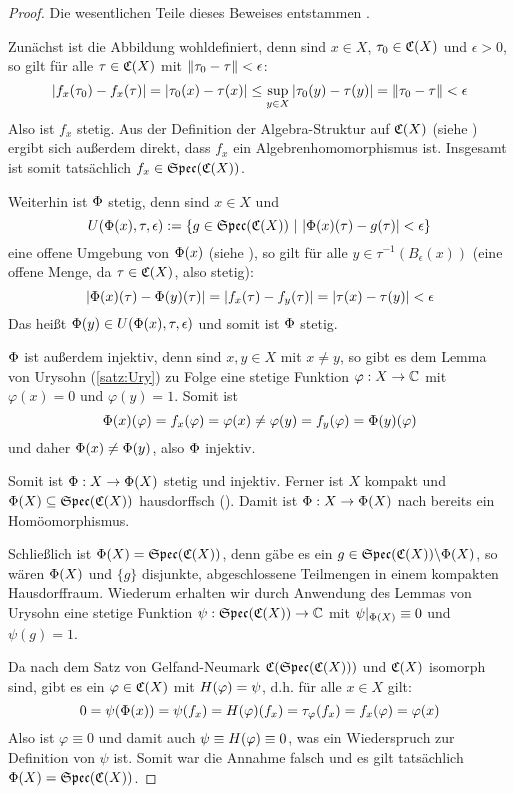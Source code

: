 \begin{proof}Die wesentlichen Teile dieses Beweises entstammen \cite[Bemerkung 2.1.33]{Baer2003}.

Zunächst ist die Abbildung wohldefiniert, denn sind $x \in X$, $\tau_0 \in \mathfrak{C}(X)$ und $\epsilon > 0$, so gilt für alle $\tau \in \mathfrak{C}(X)$ mit $\left\lVert\tau_0 - \tau\right\rVert < \epsilon$:
	\[\left|f_x(\tau_0) - f_x(\tau)\right| = \left|\tau_0(x) - \tau(x)\right| \leq \underset{y \in X}{\sup} \left|\tau_0(y) - \tau(y)\right| = \left\lVert\tau_0 - \tau\right\rVert < \epsilon \]
Also ist $f_x$ stetig. Aus der Definition der Algebra-Struktur auf $\mathfrak{C}(X)$ (siehe ) ergibt sich außerdem direkt, dass $f_x$ ein Algebrenhomomorphismus ist. Insgesamt ist somit tatsächlich $f_x \in \mathfrak{Spec}(\mathfrak{C}(X))$.

Weiterhin ist $\Phi$ stetig, denn sind $x \in X$ und 
	\[U(\Phi(x), \tau, \epsilon) := \{g \in \mathfrak{Spec}(\mathfrak{C}(X)) ~|~ |\Phi(x)(\tau) - g(\tau)| < \epsilon\}\]
eine offene Umgebung von $\Phi(x)$ (siehe ), so gilt für alle $y \in \tau^{-1}(B_\epsilon(x))$ (eine offene Menge, da $\tau \in \mathfrak{C}(X)$, also stetig):
	\[\left|\Phi(x)(\tau) - \Phi(y)(\tau)\right| = \left|f_x(\tau) - f_y(\tau)\right| = \left|\tau(x) - \tau(y)\right| < \epsilon \]
Das heißt $\Phi(y) \in U(\Phi(x), \tau, \epsilon)$ und somit ist $\Phi$ stetig.

$\Phi$ ist außerdem injektiv, denn sind $x, y \in X$ mit $x \neq y$, so gibt es dem Lemma von Urysohn (\ref{satz:Ury}) zu Folge eine stetige Funktion $\varphi: X \to \mathbb{C}$ mit $\varphi(x) = 0$ und $\varphi(y) = 1$. Somit ist 
	\[\Phi(x)(\varphi) = f_x(\varphi) = \varphi(x) \neq \varphi(y) = f_y(\varphi) = \Phi(y)(\varphi)\]
und daher $\Phi(x) \neq \Phi(y)$, also $\Phi$ injektiv.

Somit ist $\Phi: X \to \Phi(X)$ stetig und injektiv. Ferner ist $X$ kompakt und $\Phi(X) \subseteq \mathfrak{Spec}(\mathfrak{C}(X))$ hausdorffsch (). Damit ist $\Phi: X \to \Phi(X)$ nach  bereits ein Homöomorphismus.

Schließlich ist $\Phi(X) = \mathfrak{Spec}(\mathfrak{C}(X))$, denn gäbe es ein $g \in \mathfrak{Spec}(\mathfrak{C}(X)) \backslash \Phi(X)$, so wären $\Phi(X)$ und $\{g\}$ disjunkte, abgeschlossene Teilmengen in einem kompakten Hausdorffraum. Wiederum erhalten wir durch Anwendung des Lemmas von Urysohn eine stetige Funktion $\psi: \mathfrak{Spec}(\mathfrak{C}(X)) \to \mathbb{C}$ mit $\psi|_{\Phi(X)} \equiv 0$ und $\psi(g) = 1$. 

Da nach dem Satz von Gelfand-Neumark $\mathfrak{C}(\mathfrak{Spec}(\mathfrak{C}(X)))$ und $\mathfrak{C}(X)$ isomorph sind, gibt es ein $\varphi \in \mathfrak{C}(X)$ mit $H(\varphi) = \psi$, d.h. für alle $x \in X$ gilt:
	\[0 = \psi(\Phi(x)) = \psi(f_x) = H(\varphi)(f_x) = \tau_\varphi(f_x) = f_x(\varphi) = \varphi(x)\]
Also ist $\varphi \equiv 0$ und damit auch $\psi \equiv H(\varphi) \equiv 0$, was ein Wiederspruch zur Definition von $\psi$ ist. Somit war die Annahme falsch und es gilt tatsächlich $\Phi(X) = \mathfrak{Spec}(\mathfrak{C}(X))$.
\end{proof}

